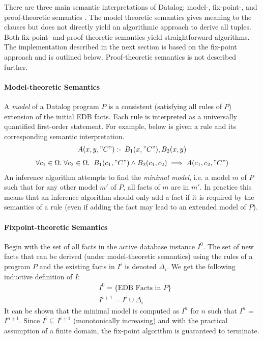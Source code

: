 There are three main semantic interpretations of Datalog: model-, fix-point-, and proof-theoretic semantics \cite{Green:2013:DRQ:2688167.2688168}. The model theoretic semantics gives meaning to the clauses but does not directly yield an algorithmic approach to derive all tuples. Both fix-point- and proof-theoretic semantics yield straightforward algorithms. The implementation described in the next section is based on the fix-point approach and is outlined below. Proof-theoretic semantics is not described further.

\paragraph{Model-theoretic Semantics}\NL
A \textit{model} of a Datalog program $P$ is a consistent (satisfying all rules of $P$) extension of the initial EDB facts. Each rule is interpreted as a universally quantified first-order statement. For example, below is given a rule and its corresponding semantic interpretation. 
\begin{align*}
A(x, y, "C") \mathbin{:\hspace{-0.5ex}\textsf{-}} \;B_1(x, "C"), B_2(x, y)
\end{align*}
\begin{align*}
\forall c_1 \in \Omega.\;\forall c_2 \in \Omega.\;\; B_1(c_1, "C") \land B_2(c_1,c_2) \implies  A(c_1, c_2, "C")
\end{align*}
An inference algorithm attempts to find the \textit{minimal model}, i.e. a model $m$ of $P$ such that for any other model $m'$ of $P$, all facts of $m$ are in $m'$. In practice this means that an inference algorithm should only add a fact if it is required by the semantics of a rule (even if adding the fact may lead to an extended model of $P$). 

\paragraph{Fixpoint-theoretic Semantics}\NL
Begin with the set of all facts in the active database instance $I^0$. The set of new facts that can be derived (under model-theoretic semantics) using the rules of a program $P$ and the existing facts in $I^i$ is denoted $\Delta_i$. We get the following inductive definition of $I$:
\begin{align*}
&I^0 = \{ \text{EDB Facts in } P \}\\
&I^{i + 1} = I^i \cup \Delta_i 
\end{align*}
It can be shown\cite{Green:2013:DRQ:2688167.2688168} that the minimal model is computed as $I^{n}$ for $n$ such that $I^{n}$ = $I^{n + 1}$. Since $I^i \subseteq I^{i + 1}$ (monotonically increasing) and with the practical assumption of a finite domain, the fix-point algorithm is guaranteed to terminate.

